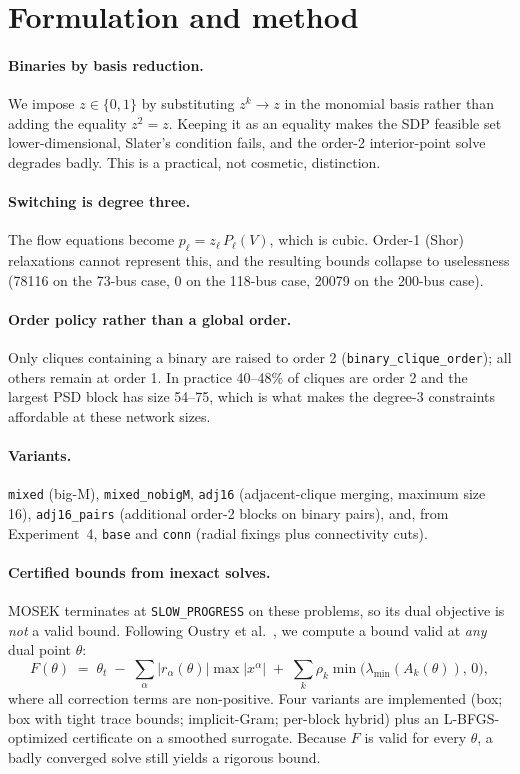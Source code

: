 \documentclass[11pt]{article}
\newcommand{\code}[1]{\texttt{\small #1}}
\begin{document}
\section{Formulation and method}

\paragraph{Binaries by basis reduction.} We impose $z \in \{0,1\}$ by substituting $z^k \to z$ in the
monomial basis rather than adding the equality $z^2 = z$. Keeping it as an equality makes the SDP
feasible set lower-dimensional, Slater's condition fails, and the order-2 interior-point solve degrades
badly. This is a practical, not cosmetic, distinction.

\paragraph{Switching is degree three.} The flow equations become $p_\ell = z_\ell \, P_\ell(V)$, which is
cubic. Order-1 (Shor) relaxations cannot represent this, and the resulting bounds collapse to
uselessness (\num{78116} on the 73-bus case, $0$ on the 118-bus case, \num{20079} on the 200-bus case).

\paragraph{Order policy rather than a global order.} Only cliques containing a binary are raised to
order 2 (\code{binary\_clique\_order}); all others remain at order 1. In practice 40--48\% of cliques are
order 2 and the largest PSD block has size 54--75, which is what makes the degree-3 constraints
affordable at these network sizes.

\paragraph{Variants.} \code{mixed} (big-M), \code{mixed\_nobigM}, \code{adj16} (adjacent-clique merging,
maximum size 16), \code{adj16\_pairs} (additional order-2 blocks on binary pairs), and, from
Experiment~4, \code{base} and \code{conn} (radial fixings plus connectivity cuts).

\paragraph{Certified bounds from inexact solves.} MOSEK terminates at \code{SLOW\_PROGRESS} on these
problems, so its dual objective is \emph{not} a valid bound. Following Oustry et al.~\cite{oustry2022}, we
compute a bound
valid at \emph{any} dual point $\theta$:
\[
  F(\theta) \;=\; \theta_t \;-\; \sum_\alpha |r_\alpha(\theta)| \max|x^\alpha|
              \;+\; \sum_k \rho_k \min\bigl(\lambda_{\min}(A_k(\theta)),\,0\bigr),
\]
where all correction terms are non-positive. Four variants are implemented (box; box with tight trace
bounds; implicit-Gram; per-block hybrid) plus an L-BFGS-optimized certificate on a smoothed surrogate.
Because $F$ is valid for every $\theta$, a badly converged solve still yields a rigorous bound.
\end{document}
